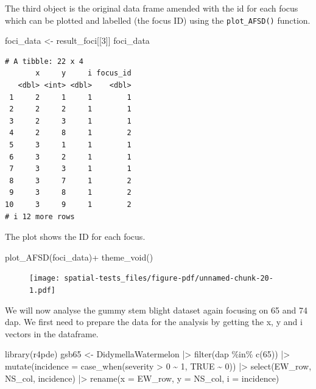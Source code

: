 \documentclass[
  letterpaper,
]{book}
\newenvironment{Shaded}{\begin{snugshade}}{\end{snugshade}}
\newcommand{\AttributeTok}[1]{\textcolor[rgb]{0.40,0.45,0.13}{#1}}
\newcommand{\ConstantTok}[1]{\textcolor[rgb]{0.56,0.35,0.01}{#1}}
\newcommand{\DecValTok}[1]{\textcolor[rgb]{0.68,0.00,0.00}{#1}}
\newcommand{\FunctionTok}[1]{\textcolor[rgb]{0.28,0.35,0.67}{#1}}
\newcommand{\NormalTok}[1]{\textcolor[rgb]{0.00,0.23,0.31}{#1}}
\newcommand{\OtherTok}[1]{\textcolor[rgb]{0.00,0.23,0.31}{#1}}
\newcommand{\SpecialCharTok}[1]{\textcolor[rgb]{0.37,0.37,0.37}{#1}}
\begin{document}
The third object is the original data frame amended with the id for each
focus which can be plotted and labelled (the focus ID) using the
\texttt{plot\_AFSD()} function.

\begin{Shaded}
\begin{Highlighting}[]
\NormalTok{foci\_data }\OtherTok{\textless{}{-}}\NormalTok{ result\_foci[[}\DecValTok{3}\NormalTok{]]}
\NormalTok{foci\_data}
\end{Highlighting}
\end{Shaded}

\begin{verbatim}
# A tibble: 22 x 4
       x     y     i focus_id
   <dbl> <int> <dbl>    <dbl>
 1     2     1     1        1
 2     2     2     1        1
 3     2     3     1        1
 4     2     8     1        2
 5     3     1     1        1
 6     3     2     1        1
 7     3     3     1        1
 8     3     7     1        2
 9     3     8     1        2
10     3     9     1        2
# i 12 more rows
\end{verbatim}

The plot shows the ID for each focus.

\begin{Shaded}
\begin{Highlighting}[]
\FunctionTok{plot\_AFSD}\NormalTok{(foci\_data)}\SpecialCharTok{+}
  \FunctionTok{theme\_void}\NormalTok{()}
\end{Highlighting}
\end{Shaded}

\begin{figure}[H]

{\centering \texttt{[image: spatial-tests\_files/figure-pdf/unnamed-chunk-20-1.pdf]}

}

\end{figure}

We will now analyse the gummy stem blight dataset again focusing on 65
and 74 dap. We first need to prepare the data for the analysis by
getting the x, y and i vectors in the dataframe.

\begin{Shaded}
\begin{Highlighting}[]
\FunctionTok{library}\NormalTok{(r4pde)}
\NormalTok{gsb65 }\OtherTok{\textless{}{-}}\NormalTok{ DidymellaWatermelon }\SpecialCharTok{|\textgreater{}} 
  \FunctionTok{filter}\NormalTok{(dap }\SpecialCharTok{\%in\%} \FunctionTok{c}\NormalTok{(}\DecValTok{65}\NormalTok{)) }\SpecialCharTok{|\textgreater{}} 
  \FunctionTok{mutate}\NormalTok{(}\AttributeTok{incidence =} \FunctionTok{case\_when}\NormalTok{(severity }\SpecialCharTok{\textgreater{}} \DecValTok{0} \SpecialCharTok{\textasciitilde{}} \DecValTok{1}\NormalTok{,}
                               \ConstantTok{TRUE} \SpecialCharTok{\textasciitilde{}} \DecValTok{0}\NormalTok{)) }\SpecialCharTok{|\textgreater{}} 
  \FunctionTok{select}\NormalTok{(EW\_row, NS\_col, incidence) }\SpecialCharTok{|\textgreater{}} 
  \FunctionTok{rename}\NormalTok{(}\AttributeTok{x =}\NormalTok{ EW\_row, }\AttributeTok{y =}\NormalTok{ NS\_col, }\AttributeTok{i =}\NormalTok{ incidence)}
\end{Highlighting}
\end{Shaded}
\end{document}
